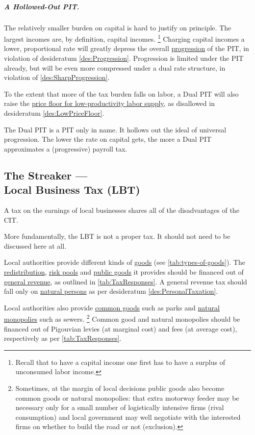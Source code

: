 \subparagraph{A Hollowed-Out PIT.}
The relatively smaller burden on capital is hard to justify on principle.
The largest incomes are, by definition, capital incomes.
\footnote{
	Recall that to have a capital income one first has to have a surplus of unconsumed labor income.
}
Charging capital incomes a lower, proportional rate will greatly depress the overall \hyperref[des:Progression]{progression} of the PIT, in violation of desideratum \ref{des:Progression}.
Progression is limited under the PIT already, but will be even more compressed under a dual rate structure, in violation of \ref{des:SharpProgression}.

To the extent that more of the tax burden falls on labor, a Dual PIT will also raise the \hyperref[des:LowPriceFloor]{price floor for low-productivity labor supply}, as disallowed in desideratum \ref{des:LowPriceFloor}.

The Dual PIT is a PIT only in name.
It hollows out the ideal of universal progression.
The lower the rate on capital gets, the more a Dual PIT approximates a (progressive) payroll tax.

\subsection[Business Tax]{The Streaker ---\\Local Business Tax (LBT)}
	\label{sec:ScoreLBT}
A tax on the earnings of local businesses shares all of the disadvantages of the CIT.

More fundamentally, the LBT is not a proper tax.
It should not need to be discussed here at all.

Local authorities provide different kinds of \hyperref[tab:types-of-goods]{goods} (see \autoref{tab:types-of-goods}).
The \hyperref[sec:Redistribution]{redistribution}, \hyperref[sec:RiskPooling]{risk pools} and \hyperref[sec:PublicGood]{public goods} it provides should be financed out of \hyperref[tab:TaxResponses]{general revenue}, as outlined in \autoref{tab:TaxResponses}.
A general revenue tax should fall only on \hyperref[des:PersonalTaxation]{natural persons} as per desideratum \ref{des:PersonalTaxation}.

Local authorities also provide \hyperref[sec:CommonGood]{common goods} such as parks and \hyperref[sec:NaturalMonopolies]{natural monopolies} such as sewers.
\footnote{
	Sometimes, at the margin of local decisions public goods also become common goods or natural monopolies:
	that extra motorway feeder may be necessary only for a small number of logistically intensive firms (rival consumption) and local government may well negotiate with the interested firms on whether to build the road or not (exclusion).
}
Common good and natural monopolies should be financed out of Pigouvian levies (at marginal cost) and fees (at average cost), respectively as per \autoref{tab:TaxResponses}.


